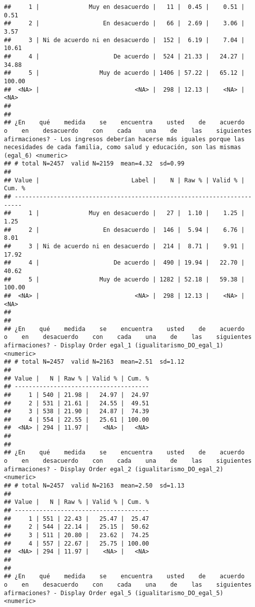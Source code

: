 \documentclass[
  10,
  landscape,
  legalpaper]{article}
\begin{document}
\begin{verbatim}
##     1 |              Muy en desacuerdo |   11 |  0.45 |    0.51 |   0.51
##     2 |                  En desacuerdo |   66 |  2.69 |    3.06 |   3.57
##     3 | Ni de acuerdo ni en desacuerdo |  152 |  6.19 |    7.04 |  10.61
##     4 |                     De acuerdo |  524 | 21.33 |   24.27 |  34.88
##     5 |                 Muy de acuerdo | 1406 | 57.22 |   65.12 | 100.00
##  <NA> |                           <NA> |  298 | 12.13 |    <NA> |   <NA>
## 
## 
## ¿En    qué    medida    se    encuentra    usted    de    acuerdo    o    en    desacuerdo    con    cada    una    de    las    siguientes    afirmaciones? - Los ingresos deberían hacerse más iguales porque las necesidades de cada familia, como salud y educación, son las mismas (egal_6) <numeric>
## # total N=2457  valid N=2159  mean=4.32  sd=0.99
## 
## Value |                          Label |    N | Raw % | Valid % | Cum. %
## ------------------------------------------------------------------------
##     1 |              Muy en desacuerdo |   27 |  1.10 |    1.25 |   1.25
##     2 |                  En desacuerdo |  146 |  5.94 |    6.76 |   8.01
##     3 | Ni de acuerdo ni en desacuerdo |  214 |  8.71 |    9.91 |  17.92
##     4 |                     De acuerdo |  490 | 19.94 |   22.70 |  40.62
##     5 |                 Muy de acuerdo | 1282 | 52.18 |   59.38 | 100.00
##  <NA> |                           <NA> |  298 | 12.13 |    <NA> |   <NA>
## 
## 
## ¿En    qué    medida    se    encuentra    usted    de    acuerdo    o    en    desacuerdo    con    cada    una    de    las    siguientes    afirmaciones? - Display Order egal_1 (igualitarismo_DO_egal_1) <numeric>
## # total N=2457  valid N=2163  mean=2.51  sd=1.12
## 
## Value |   N | Raw % | Valid % | Cum. %
## --------------------------------------
##     1 | 540 | 21.98 |   24.97 |  24.97
##     2 | 531 | 21.61 |   24.55 |  49.51
##     3 | 538 | 21.90 |   24.87 |  74.39
##     4 | 554 | 22.55 |   25.61 | 100.00
##  <NA> | 294 | 11.97 |    <NA> |   <NA>
## 
## 
## ¿En    qué    medida    se    encuentra    usted    de    acuerdo    o    en    desacuerdo    con    cada    una    de    las    siguientes    afirmaciones? - Display Order egal_2 (igualitarismo_DO_egal_2) <numeric>
## # total N=2457  valid N=2163  mean=2.50  sd=1.13
## 
## Value |   N | Raw % | Valid % | Cum. %
## --------------------------------------
##     1 | 551 | 22.43 |   25.47 |  25.47
##     2 | 544 | 22.14 |   25.15 |  50.62
##     3 | 511 | 20.80 |   23.62 |  74.25
##     4 | 557 | 22.67 |   25.75 | 100.00
##  <NA> | 294 | 11.97 |    <NA> |   <NA>
## 
## 
## ¿En    qué    medida    se    encuentra    usted    de    acuerdo    o    en    desacuerdo    con    cada    una    de    las    siguientes    afirmaciones? - Display Order egal_5 (igualitarismo_DO_egal_5) <numeric>

\end{verbatim}
\end{document}
